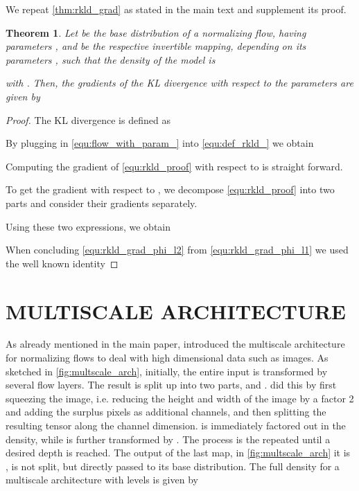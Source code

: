 \documentclass[twoside]{article}
\newtheorem{theorem}{Theorem}
\begin{document}
We repeat \autoref{thm:rkld_grad} as stated in the main text and supplement its proof.
\setcounter{theorem}{0}
\begin{theorem}
	\label{thm:rkld_grad_}
	Let  be the base distribution of a normalizing flow, having parameters , and  be the respective invertible mapping, depending on its parameters , such that the density of the model is
	
	with . Then, the gradients of the KL divergence with respect to the parameters are given by
	
\end{theorem}
\begin{proof}
    The KL divergence is defined as
    
	By plugging in \eqref{equ:flow_with_param_} into \eqref{equ:def_rkld_} we obtain
	
	Computing the gradient of \eqref{equ:rkld_proof} with respect to  is straight forward.
	
	To get the gradient with respect to , we decompose \eqref{equ:rkld_proof} into two parts and consider their gradients separately.
	\newpage
	
	
	Using these two expressions, we obtain
	
	When concluding \eqref{equ:rkld_grad_phi_l2} from \eqref{equ:rkld_grad_phi_l1} we used the well known identity
	
\end{proof}


\section{MULTISCALE ARCHITECTURE}

As already mentioned in the main paper, \cite{Dinh2017} introduced the multiscale architecture for normalizing flows to deal with high dimensional data such as images. As sketched in \autoref{fig:multscale_arch}, initially, the entire input  is transformed by several flow layers. The result is split up into two parts,  and . \cite{Dinh2017} did this by first squeezing the image, i.e. reducing the height and width of the image by a factor 2 and adding the surplus pixels as additional channels, and then splitting the resulting tensor along the channel dimension.  is immediately factored out in the density, while  is further transformed by . The process is the repeated until a desired depth is reached. The output of the last map, in \autoref{fig:multscale_arch} it is , is not split, but directly passed to its base distribution. The full density for a multiscale architecture with  levels is given by
\end{document}
